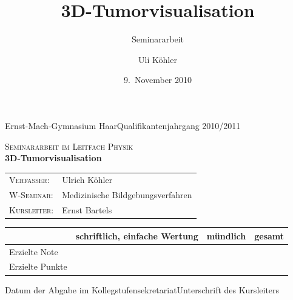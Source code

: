 \documentclass[ngerman,pdftex,paper=A4,DIV=calc,titlepage,12pt]{scrartcl}
\title{3D-Tumorvisualisation}
\subtitle{Seminararbeit}
\author{Uli Köhler}
\date{9.~November 2010}
\newtheorem[L]{boxedDefinition}{Definition}
\begin{document}
\begin{titlepage}
 Ernst-Mach-Gymnasium Haar\hfill Qualifikantenjahrgang 2010/2011
\vspace{4cm}
\begin{center}
  
 \large\textsc{Seminararbeit im Leitfach Physik}\\[2cm]
 {\fontsize{40}{40}\selectfont \textbf{3D-Tumorvisualisation}}\\[2cm]

 \begin{tabular}{ll}
  \textsc{Verfasser:} & Ulrich Köhler\\
  \textsc{W-Seminar:} & Medizinische Bildgebungsverfahren\\
  \textsc{Kursleiter:} & Ernst Bartels\\[2cm]
 \end{tabular}
\vspace{2cm}

\begin{tabular}[c]{|l|s{38mm}|s{38mm}|s{38mm}|}\hline
& schriftlich, einfache Wertung &\scriptsize mündlich &\scriptsize gesamt\\\hline
Erzielte Note & & &\\\hline
Erzielte Punkte & & &\\\hline
\end{tabular}
\vspace{3cm}

\end{center}

Datum der Abgabe im Kollegstufensekretariat\hfill Unterschrift des Kursleiters
\thispagestyle{empty}

\end{titlepage}
\thispagestyle{empty}\newpage %
\tableofcontents\thispagestyle{empty}\newpage 
\end{document}
